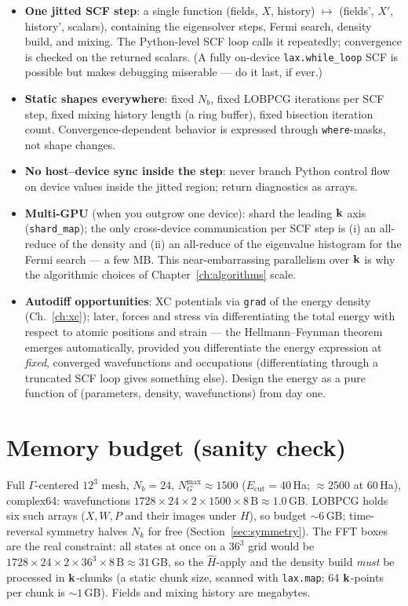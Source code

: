 \begin{itemize}[leftmargin=2em]
\item \textbf{One jitted SCF step}: a single function
(fields, $X$, history) $\mapsto$ (fields', $X'$, history', scalars),
containing the eigensolver steps, Fermi search, density build, and mixing.
The Python-level SCF loop calls it repeatedly; convergence is checked on the
returned scalars. (A fully on-device \texttt{lax.while\_loop} SCF is
possible but makes debugging miserable --- do it last, if ever.)
\item \textbf{Static shapes everywhere}: fixed $N_b$, fixed LOBPCG
iterations per SCF step, fixed mixing history length (a ring buffer),
fixed bisection iteration count. Convergence-dependent behavior is expressed
through \texttt{where}-masks, not shape changes.
\item \textbf{No host--device sync inside the step}: never branch Python
control flow on device values inside the jitted region; return diagnostics
as arrays.
\item \textbf{Multi-GPU} (when you outgrow one device): shard the leading
$\mathbf{k}$ axis (\texttt{shard\_map}); the only cross-device
communication per SCF step is (i) an all-reduce of the density and (ii) an
all-reduce of the eigenvalue histogram for the Fermi search --- a few MB.
This near-embarrassing parallelism over $\mathbf{k}$ is why the algorithmic choices
of Chapter~\ref{ch:algorithms} scale.
\item \textbf{Autodiff opportunities}: XC potentials via \texttt{grad} of the
energy density (Ch.~\ref{ch:xc}); later, forces and stress via
differentiating the total energy with respect to atomic positions and
strain --- the Hellmann--Feynman theorem emerges automatically, provided
you differentiate the energy expression at \emph{fixed}, converged
wavefunctions and occupations (differentiating through a truncated SCF
loop gives something else). Design the
energy as a pure function of (parameters, density, wavefunctions) from day
one.
\end{itemize}

\section{Memory budget (sanity check)}

Full $\Gamma$-centered $12^3$ mesh, $N_b = 24$, $N_G^{\max} \approx 1500$ ($E_{\mathrm{cut}}
= 40$\,Ha; $\approx 2500$ at $60$\,Ha), complex64:
wavefunctions $1728 \times 24 \times 2 \times 1500 \times 8\,\mathrm{B}
\approx 1.0$\,GB. LOBPCG holds six such arrays ($X, W, P$ and their images
under $H$), so budget $\sim 6$\,GB; time-reversal symmetry halves $N_k$
for free (Section~\ref{sec:symmetry}). The FFT boxes are the real constraint: all states at once on a
$36^3$ grid would be $1728\times24\times2\times36^3\times8\,\mathrm{B}
\approx 31$\,GB, so the $\hat H$-apply and the density build \emph{must} be
processed in $\mathbf{k}$-chunks (a static chunk size, scanned with
\texttt{lax.map}; 64 $\mathbf{k}$-points per chunk is $\sim 1$\,GB). Fields and
mixing history are megabytes.

